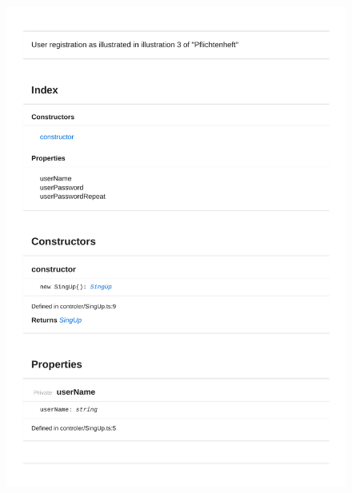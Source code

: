 \begin{figure}[H]
\centerline{\includegraphics[width=1\textwidth]{FrontendDocsAsPDF/Model/SignUp.pdf}}
\end{figure}

